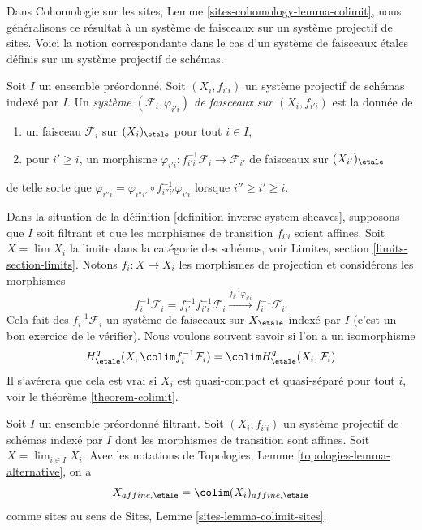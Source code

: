 \medskip\noindent
Dans Cohomologie sur les sites, Lemme \ref{sites-cohomology-lemma-colimit},
nous g\'en\'eralisons ce r\'esultat \`a un syst\`eme de faisceaux
sur un syst\`eme projectif de sites. Voici la notion correspondante
dans le cas d'un syst\`eme de faisceaux \'etales d\'efinis
sur un syst\`eme projectif de sch\'emas.

\begin{definition}
\label{definition-inverse-system-sheaves}
Soit $I$ un ensemble pr\'eordonn\'e. Soit $(X_i, f_{i'i})$ un syst\`eme
projectif de sch\'emas index\'e par $I$.
Un {\it syst\`eme $(\mathcal{F}_i, \varphi_{i'i})$ de faisceaux
sur $(X_i, f_{i'i})$} est la donn\'ee de
\begin{enumerate}
\item un faisceau $\mathcal{F}_i$ sur $(X_i)_\etale$ pour tout $i \in I$,
\item pour $i' \geq i$, un morphisme
$\varphi_{i'i} : f_{i'i}^{-1}\mathcal{F}_i \to \mathcal{F}_{i'}$
de faisceaux sur $(X_{i'})_\etale$
\end{enumerate}
de telle sorte que $\varphi_{i''i} = \varphi_{i''i'} \circ f_{i'' i'}^{-1}\varphi_{i'i}$
lorsque $i'' \geq i' \geq i$.
\end{definition}

\noindent
Dans la situation de la d\'efinition \ref{definition-inverse-system-sheaves},
supposons que $I$ soit filtrant et que les morphismes de transition $f_{i'i}$ soient affines.
Soit $X = \lim X_i$ la limite dans la cat\'egorie des sch\'emas, voir
Limites, section \ref{limits-section-limits}.
Notons $f_i : X \to X_i$ les morphismes de projection et consid\'erons les morphismes
$$
f_i^{-1}\mathcal{F}_i = f_{i'}^{-1}f_{i'i}^{-1}\mathcal{F}_i
\xrightarrow{f_{i'}^{-1}\varphi_{i'i}}
f_{i'}^{-1}\mathcal{F}_{i'}
$$
Cela fait des $f_i^{-1}\mathcal{F}_i$ un syst\`eme de faisceaux sur $X_\etale$
index\'e par $I$ (c'est un bon exercice de le v\'erifier).
Nous voulons souvent savoir si l'on a un isomorphisme
$$
H^q_\etale(X, \colim f_i^{-1}\mathcal{F}_i) =
\colim H^q_\etale(X_i, \mathcal{F}_i)
$$
Il s'av\'erera que cela est vrai si $X_i$ est quasi-compact et quasi-s\'epar\'e
pour tout $i$, voir le th\'eor\`eme \ref{theorem-colimit}.

\begin{lemma}
\label{lemma-colimit-affine-sites}
Soit $I$ un ensemble pr\'eordonn\'e filtrant. Soit $(X_i, f_{i'i})$ un syst\`eme
projectif de sch\'emas index\'e par $I$ dont les morphismes de transition sont affines.
Soit $X = \lim_{i \in I} X_i$. Avec les
notations de Topologies, Lemme \ref{topologies-lemma-alternative}, on a
$$
X_{affine, \etale} = \colim (X_i)_{affine, \etale}
$$
comme sites au sens de
Sites, Lemme \ref{sites-lemma-colimit-sites}.
\end{lemma}

